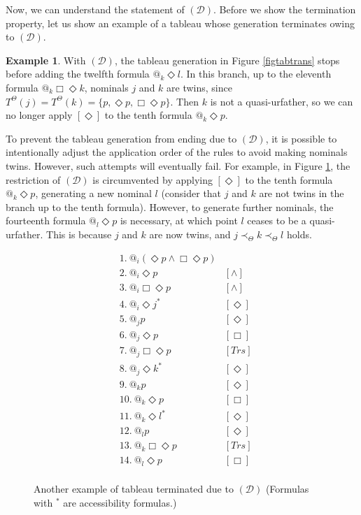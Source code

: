 \documentclass{article}
\theoremstyle{definition}
\newtheorem{example}[definition]{Example}
\newcommand{\Dia}{\Diamond}
\newcommand{\Drest}{(\mathcal{D})}
\newcommand{\trans}{\mathit{Trs}}
\begin{document}
Now, we can understand the statement of $\Drest$. Before we show the termination property, let us show an example of a tableau whose generation terminates owing to $\Drest$.

\begin{example}
    With $\Drest$, the tableau generation in Figure \ref{figtabtrans} stops before adding the twelfth formula $@_k \Dia l$. In this branch, up to the eleventh formula $@_k \Box \Dia k$, nominals $j$ and $k$ are twins, since $T^\Theta(j) = T^\Theta(k) = \{ p, \Dia p, \Box \Dia p \}$. Then $k$ is not a quasi-urfather, so we can no longer apply $[\Dia]$ to the tenth formula $@_k \Dia p$.
\end{example}

To prevent the tableau generation from ending due to $\Drest$, it is possible to intentionally adjust the application order of the rules to avoid making nominals twins. However, such attempts will eventually fail. For example, in Figure \ref{figtabtrans2}, the restriction of $\Drest$ is circumvented by applying $[\Dia]$ to the tenth formula $@_k \Dia p$, generating a new nominal $l$ (consider that $j$ and $k$ are not twins in the branch up to the tenth formula). However, to generate further nominals, the fourteenth formula $@_l \Dia p$ is necessary, at which point $l$ ceases to be a quasi-urfather. This is because $j$ and $k$ are now twins, and $j \prec_\Theta k \prec_\Theta l$ holds.

\begin{figure}[tbp]
  \begin{align*}
    &1. \ @_i (\Dia p \land \Box \Dia p) & \\
    &2. \ @_i \Dia p &[\land] \\
    &3. \ @_i \Box \Dia p &[\land] \\
    &4. \ {@_i \Dia j}^* &[\Dia] \\
    &5. \ @_j p &[\Dia] \\
    &6. \ @_j \Dia p &[\Box] \\
    &7. \ @_j \Box \Dia p &[\trans] \\
    &8. \ {@_j \Dia k}^* &[\Dia] \\
    &9. \ @_k p &[\Dia] \\ 
    &10. \ @_k \Dia p &[\Box] \\
    &11. \ {@_k \Dia l}^* &[\Dia] \\
    &12. \ @_l p &[\Dia] \\
    &13. \ @_k \Box \Dia p &[\trans] \\ 
    &14. \ @_l \Dia p &[\Box] \\
  \end{align*}
  \caption{Another example of tableau terminated due to $\Drest$ (Formulas with ${}^*$ are accessibility formulas.)}
  \label{figtabtrans2}
\end{figure}
\end{document}
